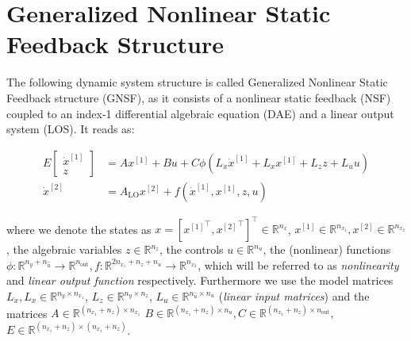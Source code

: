 \documentclass{report}
\newcommand {\matr}[2]{\left[\begin{array}{#1}#2\end{array}\right]}
\newcommand{\R}{{\mathbb{R}}}
\newcommand{\uind}[1]{^{[#1]}}
\newcommand{\defI}[1]{\textit{#1}}
\newcommand{\nxone}{{n_{x_1}}}
\newcommand{\nxtwo}{{n_{x_2}}}
\newcommand{\nx}{\ensuremath{n_x}}
\newcommand{\nz}{{n_{z}}}
\newcommand{\nout}{n_{\text{out}}}
\newcommand{\ninx}{n_{y}}
\newcommand{\ninu}{n_{\hat{u}}}
\begin{document}
\chapter*{Generalized Nonlinear Static Feedback Structure}
\newcommand{\axdot}{E_{11}}
\newcommand{\ax}{A_{1}}
\newcommand{\au}{B_{1}}
\newcommand{\aphi}{C_{1}}
\newcommand{\az}{E_{12}}
\newcommand{\bx}{A_{2}}
\newcommand{\bu}{B_{2}}
\newcommand{\bg}{C_{2}}
\newcommand{\bz}{E_{22}}
\newcommand{\bxdot}{E_{21}}
\newcommand{\lo}{A_{\text{LO}}}
\newcommand{\lx}{L_x}
\newcommand{\lxdot}{L_{\dot{x}}}
\newcommand{\lu}{L_u}
\newcommand{\lz}{L_z}

The following dynamic system structure is called Generalized Nonlinear Static Feedback structure (GNSF), as it consists of a nonlinear static feedback (NSF) coupled to an index-1 differential algebraic equation (DAE) and a linear output system (LOS). It reads as:

\begin{align*}
E \matr{c}{\dot{x}\uind{1} \\ z} & = A x\uind{1} + B u + C \phi(\lxdot\dot{x}\uind{1}+ \lx x\uind{1} + \lz z + \lu u)  	\\
\dot{x}\uind{2} &= \lo x\uind{2} + f(\dot{x}\uind{1}, x\uind{1}, z,u) 
\end{align*}

where we denote the states as $ x = \left[ {x\uind{1}}^\top, {x\uind{2}}^\top\right]^\top \in \R^{\nx} $, $ x\uind{1} \in \R^\nxone, x\uind{2}\in\R^\nxtwo $, the algebraic variables $ z \in \R^\nz $, the controls $ u \in \R^{n_u} $, the (nonlinear) functions $ \phi: \R^{\ninx + \ninu} \rightarrow \R^{\nout}, f: \R^{2\nxone + \nz + n_u} \rightarrow \R^{\nxtwo} $, which will be referred to as \defI{nonlinearity} and \defI{linear output function} respectively. Furthermore we use the model matrices $ \lxdot,\lx \in \R^{\ninx \times \nxone} $, $ \lz \in \R^{\ninx \times \nz} $, $ \lu \in \R^{\ninu \times n_u} $ (\defI{linear input matrices}) and the matrices $ A\in \R^{(\nxone + \nz) \times \nxone}$  $ B \in \R^{(\nxone + \nz) \times n_u},
C \in \R^{(\nxone + \nz) \times \nout},$  $E \in \R^{(\nxone + \nz) \times (\nxone + \nz)} $.
\end{document}
